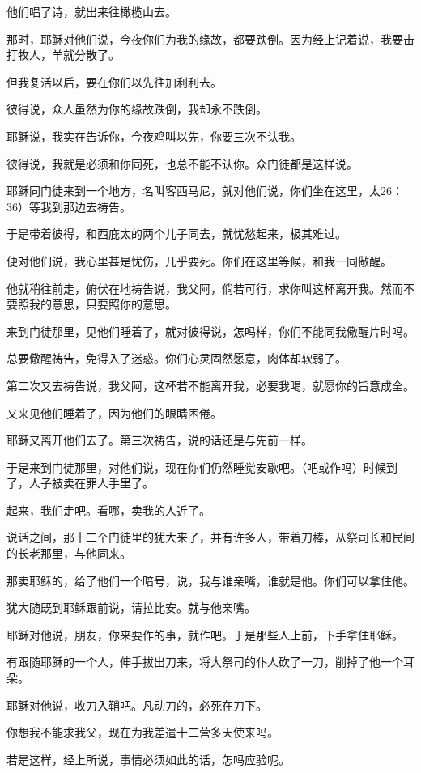 \documentclass[12pt,oneside]{book}
\begin{document}
他们唱了诗，就出来往橄榄山去。

那时，耶稣对他们说，今夜你们为我的缘故，都要跌倒。因为经上记着说，我要击打牧人，羊就分散了。

但我复活以后，要在你们以先往加利利去。

彼得说，众人虽然为你的缘故跌倒，我却永不跌倒。

耶稣说，我实在告诉你，今夜鸡叫以先，你要三次不认我。

彼得说，我就是必须和你同死，也总不能不认你。众门徒都是这样说。

耶稣同门徒来到一个地方，名叫客西马尼，就对他们说，你们坐在这里，太26：36）等我到那边去祷告。

于是带着彼得，和西庇太的两个儿子同去，就忧愁起来，极其难过。

便对他们说，我心里甚是忧伤，几乎要死。你们在这里等候，和我一同儆醒。

他就稍往前走，俯伏在地祷告说，我父阿，倘若可行，求你叫这杯离开我。然而不要照我的意思，只要照你的意思。

来到门徒那里，见他们睡着了，就对彼得说，怎吗样，你们不能同我儆醒片时吗。

总要儆醒祷告，免得入了迷惑。你们心灵固然愿意，肉体却软弱了。

第二次又去祷告说，我父阿，这杯若不能离开我，必要我喝，就愿你的旨意成全。

又来见他们睡着了，因为他们的眼睛困倦。

耶稣又离开他们去了。第三次祷告，说的话还是与先前一样。

于是来到门徒那里，对他们说，现在你们仍然睡觉安歇吧。（吧或作吗）时候到了，人子被卖在罪人手里了。

起来，我们走吧。看哪，卖我的人近了。

说话之间，那十二个门徒里的犹大来了，并有许多人，带着刀棒，从祭司长和民间的长老那里，与他同来。

那卖耶稣的，给了他们一个暗号，说，我与谁亲嘴，谁就是他。你们可以拿住他。

犹大随既到耶稣跟前说，请拉比安。就与他亲嘴。

耶稣对他说，朋友，你来要作的事，就作吧。于是那些人上前，下手拿住耶稣。

有跟随耶稣的一个人，伸手拔出刀来，将大祭司的仆人砍了一刀，削掉了他一个耳朵。

耶稣对他说，收刀入鞘吧。凡动刀的，必死在刀下。

你想我不能求我父，现在为我差遣十二营多天使来吗。

若是这样，经上所说，事情必须如此的话，怎吗应验呢。
\end{document}
